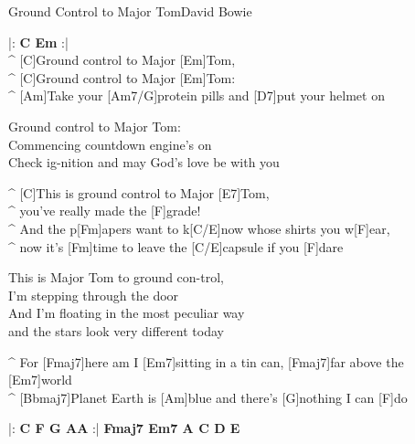 \begin{song}{Ground Control to Major Tom}{David Bowie}

\begin{guitar}
|: \textbf{C  Em} :|\\
^ [C]Ground control to Major [Em]Tom,\\
^ [C]Ground control to Major [Em]Tom:\\
^ [Am]Take your [Am7/G]protein pills and [D7]put your helmet on\\
\end{guitar}

\begin{guitar}
Ground control to Major Tom:\\
Commencing countdown engine's on\\
Check ig-nition and may God's love be with you\\
\end{guitar}

\medskip
{}
\begin{guitar}
^ [C]This is ground control to Major [E7]Tom, \\
^ you've really made the [F]grade!\\
^ And the p[Fm]apers want to k[C/E]now whose shirts you w[F]ear, \\
^ now it's [Fm]time to leave the [C/E]capsule if you [F]dare\\
\end{guitar}

\medskip
{}
\begin{guitar}
This is Major Tom to ground con-trol, \\
I'm stepping through the door\\
And I'm floating in the most peculiar way \\
and the stars look very different today\\
\end{guitar}


\medskip
{}
\begin{guitar}
^ For [Fmaj7]here am I [Em7]sitting in a tin can, [Fmaj7]far above the [Em7]world\\
^ [Bbmaj7]Planet Earth is [Am]blue and there's [G]nothing I can [F]do\\
\end{guitar}


\medskip
{}
\begin{guitar}
|: \textbf{C F G AA} :| \textbf{Fmaj7  Em7  A  C  D  E}\\
\end{guitar}


\end{song}
